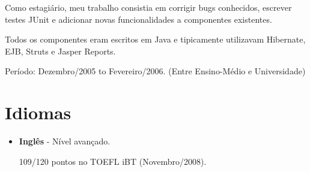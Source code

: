 \documentclass[a4paper,10pt]{article}
\begin{document}
\begin{itemize}


        Como estagiário, meu trabalho consistia em corrigir bugs conhecidos, escrever testes JUnit e adicionar novas funcionalidades a componentes existentes.

        Todos os componentes eram escritos em Java e tipicamente utilizavam Hibernate, EJB, Struts e Jasper Reports.

        Período: Dezembro/2005 to Fevereiro/2006. {\small(Entre Ensino-Médio e Universidade)}
    \end{itemize}

  \section{Idiomas}
    \begin{itemize}
      \item  
        \textbf{Inglês} - Nível avançado.

        109/120 pontos no TOEFL iBT (Novembro/2008).

    \end{itemize}
\end{document}
